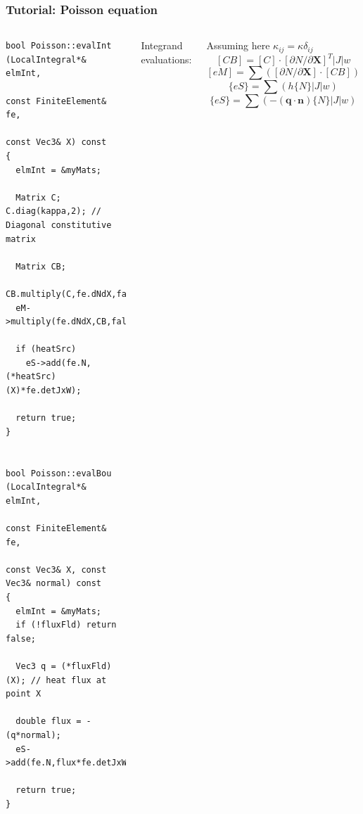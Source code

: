\documentclass{beamer}
\begin{document}
\begin{frame}[fragile] %
 \frametitle{Tutorial: Poisson equation}

 \begin{columns}[c]
  \tiny\begin{verbatim}
bool Poisson::evalInt (LocalIntegral*& elmInt,
                       const FiniteElement& fe,
                       const Vec3& X) const
{
  elmInt = &myMats;

  Matrix C; C.diag(kappa,2); // Diagonal constitutive matrix

  Matrix CB;
  CB.multiply(C,fe.dNdX,false,true).multiply(fe.detJxW);
  eM->multiply(fe.dNdX,CB,false,false,true);

  if (heatSrc)
    eS->add(fe.N,(*heatSrc)(X)*fe.detJxW);

  return true;
}


bool Poisson::evalBou (LocalIntegral*& elmInt,
                       const FiniteElement& fe,
                       const Vec3& X, const Vec3& normal) const
{
  elmInt = &myMats;
  if (!fluxFld) return false;

  Vec3 q = (*fluxFld)(X); // heat flux at point X

  double flux = -(q*normal);
  eS->add(fe.N,flux*fe.detJxW);

  return true;
}
  \end{verbatim}
  \small
  Integrand evaluations:

  Assuming here $\kappa_{ij} = \kappa\delta_{ij}$
  $$
  [CB] = [C]\cdot[\partial N/\partial\bm{X}]^T|J|w
  $$
  $$
  [eM] = \sum\left([\partial N/\partial\bm{X}]\cdot[CB]\right)
  $$
  $$
  \{eS\} = \sum\left(h\{N\}|J|w\right)
  $$
  \vskip15mm
  $$
  \{eS\} = \sum\left(-(\bm{q}\cdot\bm{n})\{N\}|J|w \right)
  $$
 \end{columns}
\end{frame}
\end{document}
